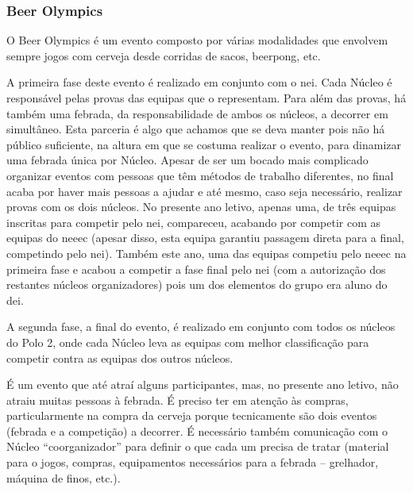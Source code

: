 
\subsubsection{Beer Olympics}

O Beer Olympics é um evento composto por várias modalidades que envolvem sempre jogos com cerveja desde corridas de sacos, beerpong, etc.

A primeira fase deste evento é realizado em conjunto com o \acrshort{nei}. Cada Núcleo é responsável pelas provas das equipas que o representam. Para além das provas, há também uma febrada, da responsabilidade de ambos os núcleos, a decorrer em simultâneo. Esta parceria é algo que achamos que se deva manter pois não há público suficiente, na altura em que se costuma realizar o evento, para dinamizar uma febrada única por Núcleo. Apesar de ser um bocado mais complicado organizar eventos com pessoas que têm métodos de trabalho diferentes, no final acaba por haver mais pessoas a ajudar e até mesmo, caso seja necessário, realizar provas com os dois núcleos. No presente ano letivo, apenas uma, de três equipas inscritas para competir pelo \acrshort{nei}, compareceu, acabando por competir com as equipas do \acrshort{neeec} (apesar disso, esta equipa garantiu passagem direta para a final, competindo pelo \acrshort{nei}). Também este ano, uma das equipas competiu pelo \acrshort{neeec} na primeira fase e acabou a competir a fase final pelo \acrshort{nei} (com a autorização dos restantes núcleos organizadores) pois um dos elementos do grupo era aluno do \acrshort{dei}.

A segunda fase, a final do evento, é realizado em conjunto com todos os núcleos do Polo 2, onde cada Núcleo leva as equipas com melhor classificação para competir contra as equipas dos outros núcleos.

É um evento que até atraí alguns participantes, mas, no presente ano letivo, não atraiu muitas pessoas à febrada. É preciso ter em atenção às compras, particularmente na compra da cerveja porque tecnicamente são dois eventos (febrada e a competição) a decorrer. É necessário também comunicação com o Núcleo “coorganizador” para definir o que cada um precisa de tratar (material para o jogos, compras, equipamentos necessários para a febrada – grelhador, máquina de finos, etc.).

